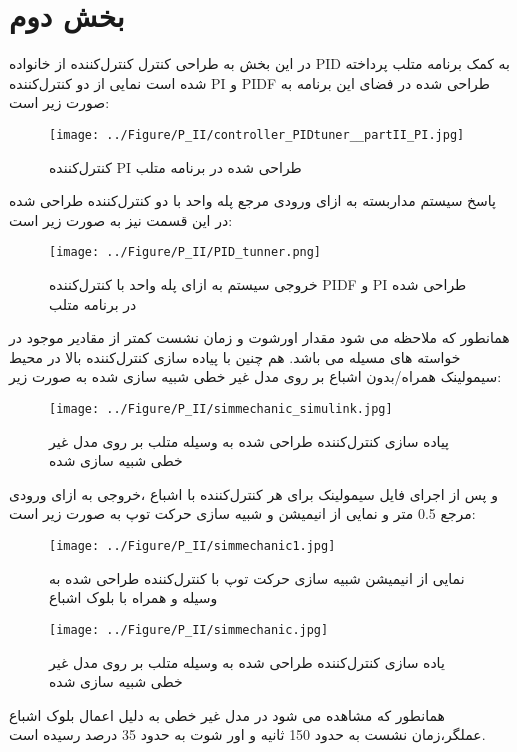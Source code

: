 \chapter{بخش دوم}
در این بخش به طراحی کنترل کنترل‌کننده از خانواده  PID به کمک برنامه   متلب پرداخته شده است نمایی از دو کنترل‌کننده PI  و PIDF طراحی شده در فضای این برنامه به صورت زیر است:
\begin{figure}[H]
	\centering
	\texttt{[image: ../Figure/P\_II/controller\_PIDtuner\_\_partII\_PI.jpg]}
	\caption{کنترل‌کننده PI طراحی شده در برنامه  متلب}
\end{figure}


پاسخ سیستم مداربسته به ازای ورودی مرجع پله واحد با دو کنترل‌کننده طراحی شده در این قسمت نیز به صورت زیر است:
\begin{figure}[H]
	\centering
	\texttt{[image: ../Figure/P\_II/PID\_tunner.png]}
	\caption{خروجی سیستم به ازای پله واحد با کنترل‌کننده PIDF و PI طراحی شده در برنامه  متلب}
\end{figure}


همانطور که ملاحظه می شود مقدار اورشوت و زمان نشست کمتر از مقادیر موجود در خواسته های مسیله می باشد.
هم چنین با پیاده سازی کنترل‌کننده بالا در محیط سیمولینک همراه/بدون اشباع بر روی مدل غیر خطی شبیه سازی شده به صورت زیر:
\begin{figure}[H]
	\centering
	\texttt{[image: ../Figure/P\_II/simmechanic\_simulink.jpg]}
	\caption{پیاده سازی کنترل‌کننده طراحی شده به وسیله  متلب بر روی مدل غیر خطی شبیه سازی شده}
\end{figure}

و پس از اجرای فایل سیمولینک برای هر کنترل‌کننده با اشباع ،خروجی به ازای ورودی مرجع 0.5 متر و نمایی از انیمیشن و شبیه سازی حرکت توپ به صورت زیر است:
\begin{figure}[H]
	\centering
	\texttt{[image: ../Figure/P\_II/simmechanic1.jpg]}
	\caption{نمایی از انیمیشن شبیه سازی حرکت توپ با کنترل‌کننده طراحی شده به وسیله  و همراه با بلوک اشباع}
\end{figure}
\begin{figure}[H]
	\centering
	\texttt{[image: ../Figure/P\_II/simmechanic.jpg]}
	\caption{یاده سازی کنترل‌کننده طراحی شده به وسیله  متلب بر روی مدل غیر خطی شبیه سازی شده}
\end{figure}

همانطور که مشاهده می شود در مدل غیر خطی به دلیل اعمال بلوک اشباع عملگر،زمان نشست به حدود 150 ثانیه و اور شوت به حدود 35 درصد رسیده است.